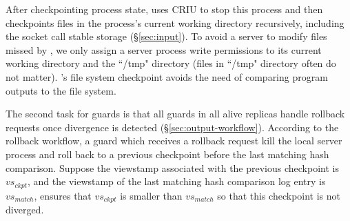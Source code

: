 After checkpointing process state, \xxx uses CRIU to stop this process and then 
checkpoints files in the process's current working directory recursively, 
including the socket call stable storage (\S\ref{sec:input}). To avoid a server 
to modify files missed by \xxx, we only assign a server process write 
permissions to its current working directory and the ``/tmp" directory (files in 
``/tmp" directory often do not matter). \xxx's file system checkpoint avoids the 
need of comparing program outputs to the file system.


The second task for guards is that all guards in all alive replicas handle 
rollback requests once divergence is detected (\S\ref{sec:output-workflow}). 
According to the rollback workflow, a guard which receives a rollback request 
kill the local server process and roll back to a previous checkpoint before the 
last matching hash comparison. Suppose the viewstamp associated with the 
previous checkpoint is $vs_{ckpt}$, and the viewstamp of the last matching hash 
comparison log entry is $vs_{match}$, \xxx ensures that $vs_{ckpt}$ 
is smaller than $vs_{match}$ so that this checkpoint is not diverged.





% 


